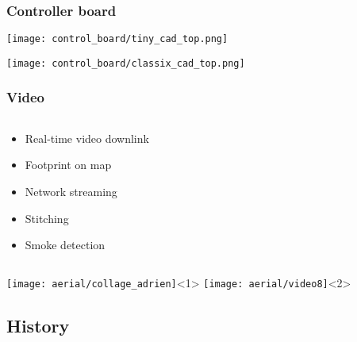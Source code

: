 %
\begin{frame}
  \frametitle{Controller board}
  \begin{center}
    \texttt{[image: control\_board/tiny\_cad\_top.png]}
   
    \texttt{[image: control\_board/classix\_cad\_top.png]}    
  \end{center}
\end{frame}


%



%
\begin{frame}
\frametitle{Video}

\begin{columns}
\begin{column}{5cm}
\begin{itemize}
\item Real-time video downlink
\item Footprint on map
\item Network streaming
\item Stitching
\item Smoke detection
\end{itemize}
\end{column}
\begin{column}{5cm}
\begin{center}
\end{center}
\end{column}
\end{columns}
\begin{center}
\texttt{[image: aerial/collage\_adrien]}<1>
\texttt{[image: aerial/video8]}<2>
\end{center}
\end{frame}


%
%
\subsection{History}
